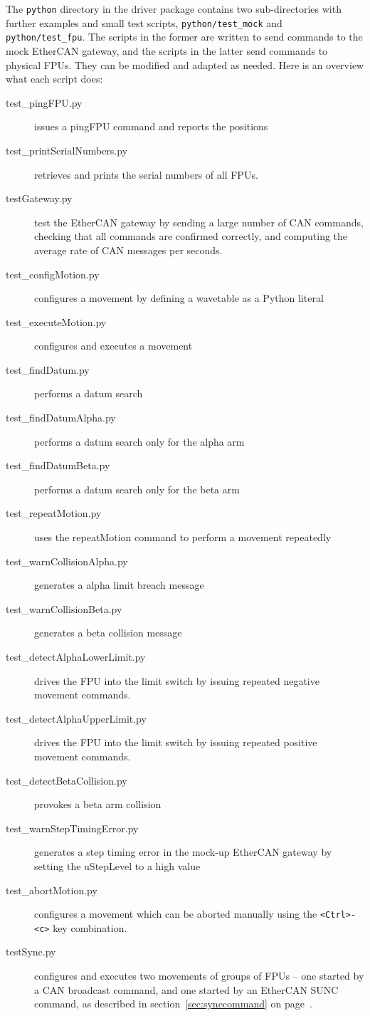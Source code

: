 \documentclass[fontsize=12,a4paper]{scrreprt}
\begin{document}
The \texttt{python} directory in the driver package contains
two sub-directories with further examples and small test scripts,
\texttt{python/test\_mock} and \texttt{python/test\_fpu}. The scripts in
the former are written to send commands to the mock EtherCAN
gateway, and the scripts in the latter send commands
to physical FPUs. They can be modified and adapted
as needed. Here is an overview what each script does:

\begin{description}
\item[test\_pingFPU.py] issues a pingFPU command and reports the positions
\item[test\_printSerialNumbers.py] retrieves and prints the serial numbers of all FPUs.
\item[testGateway.py] test the EtherCAN gateway by sending a large
  number of CAN commands, checking that all commands are confirmed
  correctly, and computing the average rate of CAN messages per seconds.
\item[test\_configMotion.py] configures a movement by defining a wavetable as a Python literal
\item[test\_executeMotion.py] configures and executes a movement
\item[test\_findDatum.py] performs a datum search
\item[test\_findDatumAlpha.py] performs a datum search only for the alpha arm
\item[test\_findDatumBeta.py] performs a datum search only for the beta arm
\item[test\_repeatMotion.py] uses the repeatMotion command to perform a movement repeatedly
\item[test\_warnCollisionAlpha.py] generates a alpha limit breach message
\item[test\_warnCollisionBeta.py] generates a beta collision message
\item[test\_detectAlphaLowerLimit.py] drives the FPU into the limit switch by issuing repeated negative movement commands.
\item[test\_detectAlphaUpperLimit.py] drives the FPU into the limit switch by issuing repeated positive movement commands.
\item[test\_detectBetaCollision.py] provokes a beta arm collision
\item[test\_warnStepTimingError.py] generates a step timing error
  in the mock-up EtherCAN gateway by setting the uStepLevel to a high
  value
\item[test\_abortMotion.py]  configures a movement which can be aborted
  manually using the \verb+<Ctrl>-<c>+ key combination.
\item[testSync.py] configures and executes two movements of groups of
  FPUs -- one started by a CAN broadcast command, and one started by
  an EtherCAN SUNC command, as described in
  section~\ref{sec:synccommand} on page~\pageref{sec:synccommand}.
\end{description}
\end{document}
